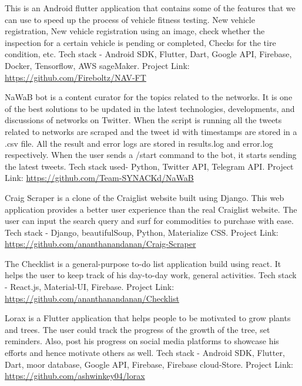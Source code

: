 \documentclass[11pt,a4paper,sans]{moderncv}        %
\begin{document}
{This is an Android flutter application that contains some of the features that we can use to speed up the process of vehicle fitness testing. New vehicle registration, New vehicle registration using an image, check whether the inspection for a certain vehicle is pending or completed, Checks for the tire condition, etc. Tech stack - Android SDK, Flutter, Dart, Google API, Firebase, Docker, Tensorflow, AWS sageMaker. Project Link: {\newline}
\url{https://github.com/Fireboltz/NAV-FT}}{}

{NaWaB bot is a content curator for the topics related to the networks. It is one of the best solutions to be updated in the latest technologies, developments, and discussions of networks on Twitter. When the script is running all the tweets related to networks are scraped and the tweet id with timestamps are stored in a .csv file. All the result and error logs are stored in results.log and error.log respectively. When the user sends a /start command to the bot, it starts sending the latest tweets. Tech stack used- Python, Twitter API, Telegram API. Project Link: {\newline}
\url{https://github.com/Team-SYNACKd/NaWaB}}{}

{Craig Scraper is a clone of the Craiglist website built using Django. This web application provides a better user experience than the real Craiglist website. The user can input the search query and surf for commodities to purchase with ease. Tech stack - Django, beautifulSoup, Python, Materialize CSS. Project Link: {\newline}
\url{https://github.com/ananthanandanan/Craig-Scraper}}{}


{The Checklist is a general-purpose to-do list application build using react. It helps the user to keep track of his day-to-day work, general activities. Tech stack - React.js, Material-UI, Firebase. Project Link: {\newline}
\url{https://github.com/ananthanandanan/Checklist}}{}


{Lorax is a Flutter application that helps people to be motivated to grow plants and trees. The user could track the progress of the growth of the tree, set reminders. Also, post his progress on social media platforms to showcase his efforts and hence motivate others as well. Tech stack - Android SDK, Flutter, Dart, moor database, Google API, Firebase, Firebase cloud-Store. Project Link: {\newline}
\url{https://github.com/ashwinkey04/lorax}}{}
\end{document}
